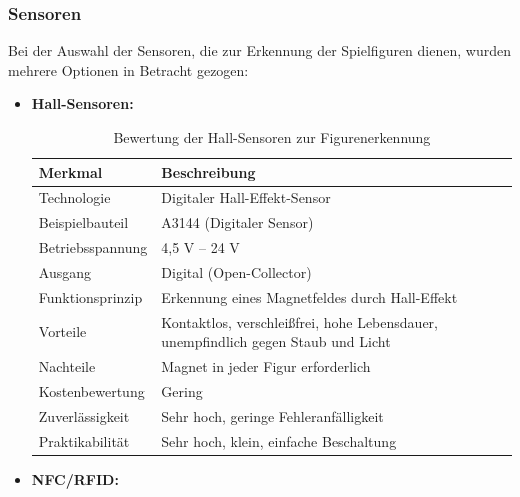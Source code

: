 \subsubsection{Sensoren}

Bei der Auswahl der Sensoren, die zur Erkennung der Spielfiguren dienen, wurden mehrere Optionen in Betracht gezogen:

\begin{itemize}
\item \textbf{Hall-Sensoren:} \cite{allegro_a3144}
\begin{table}[H]
\centering
\renewcommand{\arraystretch}{1.3}
\begin{tabular}{|p{4cm}|p{7cm}|}
\hline
\textbf{Merkmal} & \textbf{Beschreibung} \\
\hline
Technologie & Digitaler Hall-Effekt-Sensor \\
\hline
Beispielbauteil & A3144 (Digitaler Sensor) \\
\hline
Betriebsspannung & 4,5 V – 24 V \\
\hline
Ausgang & Digital (Open-Collector) \\
\hline
Funktionsprinzip & Erkennung eines Magnetfeldes durch Hall-Effekt \\
\hline
Vorteile & Kontaktlos, verschleißfrei, hohe Lebensdauer, unempfindlich gegen Staub und Licht \\
\hline
Nachteile & Magnet in jeder Figur erforderlich \\
\hline
Kostenbewertung & Gering \\
\hline
Zuverlässigkeit & Sehr hoch, geringe Fehleranfälligkeit \\
\hline
Praktikabilität & Sehr hoch, klein, einfache Beschaltung \\
\hline
\end{tabular}
\caption{Bewertung der Hall-Sensoren zur Figurenerkennung}
\label{tab:hall}
\end{table}

\item \textbf{NFC/RFID:} \cite{nxp_pn532, nxp_mfrc522}


\end{itemize}
